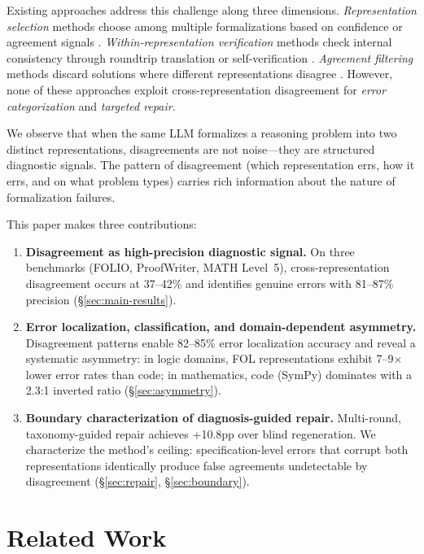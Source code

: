 \documentclass[11pt,a4paper]{article}
\begin{document}
Existing approaches address this challenge along three dimensions. \emph{Representation selection} methods choose among multiple formalizations based on confidence or agreement signals \cite{hybridmind2024,adaptive2024}. \emph{Within-representation verification} methods check internal consistency through roundtrip translation or self-verification \cite{vericot2024,verge2024,roundtrip2026}. \emph{Agreement filtering} methods discard solutions where different representations disagree \cite{liang2024cotpot,prove2024}. However, none of these approaches exploit cross-representation disagreement for \emph{error categorization} and \emph{targeted repair}.

We observe that when the same LLM formalizes a reasoning problem into two distinct representations, disagreements are not noise---they are structured diagnostic signals. The pattern of disagreement (which representation errs, how it errs, and on what problem types) carries rich information about the nature of formalization failures.

This paper makes three contributions:

\begin{enumerate}[leftmargin=*,itemsep=2pt]
\item \textbf{Disagreement as high-precision diagnostic signal.} On three benchmarks (FOLIO, ProofWriter, MATH Level~5), cross-representation disagreement occurs at 37--42\% and identifies genuine errors with 81--87\% precision (\S\ref{sec:main-results}).

\item \textbf{Error localization, classification, and domain-dependent asymmetry.} Disagreement patterns enable 82--85\% error localization accuracy and reveal a systematic asymmetry: in logic domains, FOL representations exhibit 7--9$\times$ lower error rates than code; in mathematics, code (SymPy) dominates with a 2.3:1 inverted ratio (\S\ref{sec:asymmetry}).

\item \textbf{Boundary characterization of diagnosis-guided repair.} Multi-round, taxonomy-guided repair achieves +10.8pp over blind regeneration. We characterize the method's ceiling: specification-level errors that corrupt both representations identically produce false agreements undetectable by disagreement (\S\ref{sec:repair}, \S\ref{sec:boundary}).
\end{enumerate}

\section{Related Work}
\label{sec:related}
\end{document}
